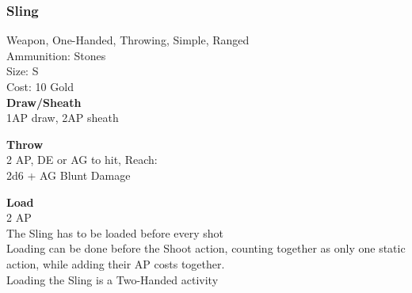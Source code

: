 \subsubsection{Sling}\label{weapon:sling}
Weapon, One-Handed, Throwing, Simple, Ranged\\
Ammunition: Stones\\
Size: S\\
Cost: 10 Gold\\

\textbf{Draw/Sheath}\\
1AP draw, 2AP sheath

\textbf{Throw}\\
2 AP, DE or AG to hit,  Reach:\\
2d6 + \texttimes AG Blunt Damage

\textbf{Load}\\
2 AP\\
The Sling has to be loaded before every shot\\
Loading can be done before the Shoot action, counting together as only one static action, while adding their AP costs together.\\
Loading the Sling is a Two-Handed activity
